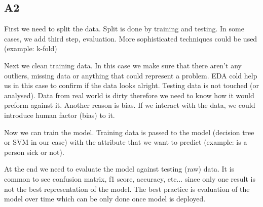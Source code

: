 \subsection{A2}\label{A2}

First we need to split the data. Split is done by training and testing. In some cases, we add third step, evaluation. More sophisticated techniques could be used (example: k-fold)

Next we clean training data. In this case we make sure that there aren't any outliers, missing data or anything that could represent a problem. EDA cold help us in this case to confirm if the data looks alright. Testing data is not touched (or analysed). Data from real world is dirty therefore we need to know how it would preform against it. Another reason is bias. If we interact with the data, we could introduce human factor (bias) to it.

Now we can train the model. Training data is passed to the model (decision tree or SVM in our case) with the attribute that we want to predict (example: is a person sick or not).

At the end we need to evaluate the model against testing (raw) data. It is common to see confusion matrix, f1 score, accuracy, etc... since only one result is not the best representation of the model. The best practice is evaluation of the model over time which can be only done once model is deployed.